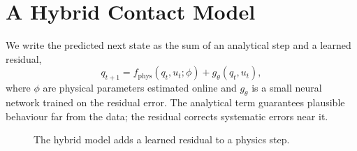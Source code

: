 \chapter{A Hybrid Contact Model}
\label{ch:method}

We write the predicted next state as the sum of an analytical step and a learned residual,
\begin{equation}
  q_{t+1} = f_{\mathrm{phys}}(q_t, u_t; \phi) + g_\theta(q_t, u_t),
  \label{eq:hybrid}
\end{equation}
where $\phi$ are physical parameters estimated online and $g_\theta$ is a small neural network
trained on the residual error. The analytical term guarantees plausible behaviour far from the
data; the residual corrects systematic errors near it.

\begin{figure}[htbp]
  \centering
  \caption{The hybrid model adds a learned residual to a physics step.}
  \label{fig:hybrid}
\end{figure}
